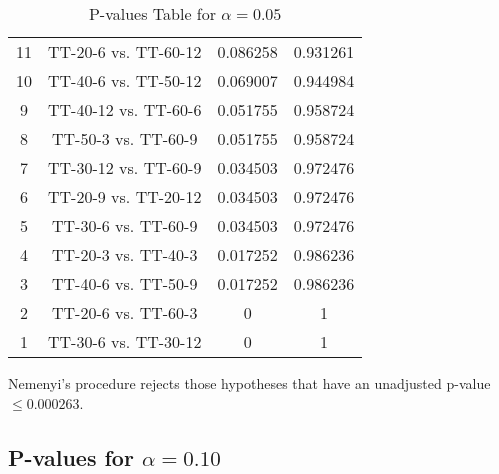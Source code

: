 \documentclass[a4paper,10pt]{article}
\begin{document}
\begin{landscape}
\begin{table}[!htp]
\begin{tabular}{cccc}
11&TT-20-6 vs. TT-60-12&0.086258&0.931261\\
10&TT-40-6 vs. TT-50-12&0.069007&0.944984\\
9&TT-40-12 vs. TT-60-6&0.051755&0.958724\\
8&TT-50-3 vs. TT-60-9&0.051755&0.958724\\
7&TT-30-12 vs. TT-60-9&0.034503&0.972476\\
6&TT-20-9 vs. TT-20-12&0.034503&0.972476\\
5&TT-30-6 vs. TT-60-9&0.034503&0.972476\\
4&TT-20-3 vs. TT-40-3&0.017252&0.986236\\
3&TT-40-6 vs. TT-50-9&0.017252&0.986236\\
2&TT-20-6 vs. TT-60-3&0&1\\
1&TT-30-6 vs. TT-30-12&0&1\\
\hline
\end{tabular}
\caption{P-values Table for $\alpha=0.05$}
\end{table}Nemenyi's procedure rejects those hypotheses that have an unadjusted p-value $\le0.000263$.

\pagebreak

\subsection{P-values for $\alpha=0.10$}


\end{landscape}
\end{document}
